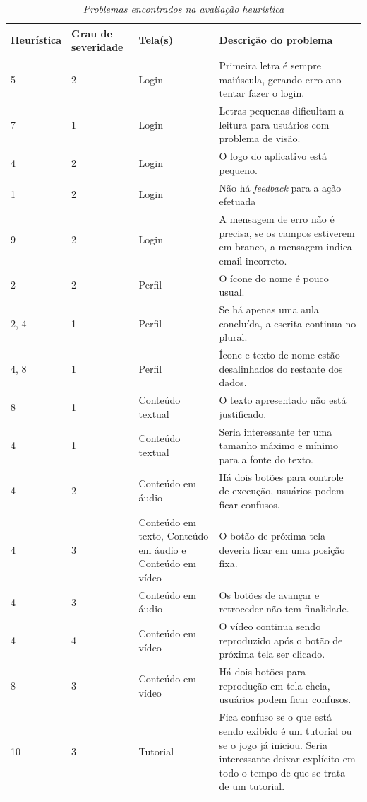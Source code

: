 \begin{table}[H]
\centering
\caption{\textit{Problemas encontrados na avaliação heurística}}
\centering
\footnotesize
\begin{tabular}{p{1.5cm} p{2cm} p{4cm} p{8.5cm}}
\toprule
\textbf{Heurística} & \textbf{Grau de severidade} & \textbf{Tela(s)} & \textbf{Descrição do problema}       
\\ \midrule
5
& 
2
&
Login
&
Primeira letra é sempre maiúscula, gerando erro ano tentar fazer o login.
\\ \midrule
7
& 
1
&
Login
&
Letras pequenas dificultam a leitura para usuários com problema de visão.
\\ \midrule
4
& 
2
&
Login
&
O logo do aplicativo está pequeno.
\\ \midrule

1
& 
2
&
Login
&
Não há \textit{feedback} para a ação efetuada
\\ \midrule
9
& 
2
&
Login
&
A mensagem de erro não é precisa, se os campos estiverem em branco, a mensagem indica email incorreto.
\\ \midrule
2
& 
2
&
Perfil
&
O ícone do nome é pouco usual.
\\ \midrule
2, 4
& 
1
&
Perfil
&
Se há apenas uma aula concluída, a escrita continua no plural.
\\ \midrule
4, 8
& 
1
&
Perfil
&
Ícone e texto de nome estão desalinhados do restante dos dados.
\\ \midrule
8
& 
1
&
Conteúdo textual
&
O texto apresentado não está justificado.
\\ \midrule
4
& 
1
&
Conteúdo textual
&
Seria interessante ter uma tamanho máximo e mínimo para a fonte do texto.
\\ \midrule
4
& 
2
&
Conteúdo em áudio
&
Há dois botões para controle de execução, usuários podem ficar confusos.
\\ \midrule
4
& 
3
&
Conteúdo em texto, Conteúdo em áudio e Conteúdo em vídeo
&
O botão de próxima tela deveria ficar em uma posição fixa.
\\ \midrule
4
& 
3
&
Conteúdo em áudio
&
Os botões de avançar e retroceder não tem finalidade.
\\ \midrule
4
& 
4
&
Conteúdo em vídeo
&
O vídeo continua sendo reproduzido após o botão de próxima tela ser clicado.
\\ \midrule
8
& 
3
&
Conteúdo em vídeo
&
Há dois botões para reprodução em tela cheia, usuários podem ficar confusos.
\\ \midrule
10
& 
3
&
Tutorial
&
Fica confuso se o que está sendo exibido é um tutorial ou se o jogo já iniciou. Seria interessante deixar explícito em todo o tempo de que se trata de um tutorial.

\end{tabular}
\end{table}
